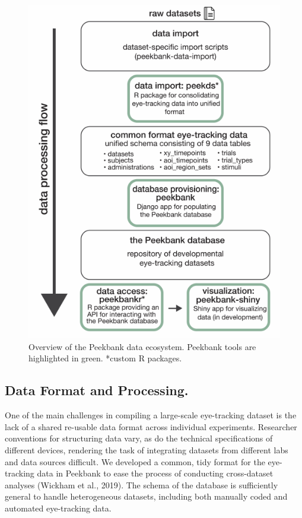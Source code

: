 \documentclass[
  english,
  man]{apa6}
\begin{document}
\begin{figure}

{\centering \includegraphics{peekbank-brm_files/figure-latex/fig-framework-overview-1} 

}

\caption{Overview of the Peekbank data ecosystem. Peekbank tools are highlighted in green. *custom R packages.}\label{fig:fig-framework-overview}
\end{figure}

\hypertarget{data-format-and-processing.}{%
\subsection{Data Format and Processing.}\label{data-format-and-processing.}}

One of the main challenges in compiling a large-scale eye-tracking dataset is the lack of a shared re-usable data format across individual experiments. Researcher conventions for structuring data vary, as do the technical specifications of different devices, rendering the task of integrating datasets from different labs and data sources difficult. We developed a common, tidy format for the eye-tracking data in Peekbank to ease the process of conducting cross-dataset analyses (Wickham et al., 2019). The schema of the database is sufficiently general to handle heterogeneous datasets, including both manually coded and automated eye-tracking data.
\end{document}

